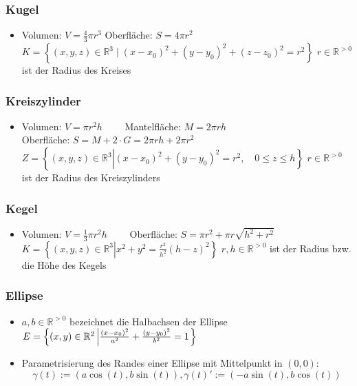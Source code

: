 \documentclass[a3paper, 11pt, landscape]{scrartcl}
\begin{document}
\begin{multicols*}{3}
	\subsubsection{Kugel}
	\begin{itemize}
	    \item Volumen: $V=\frac{4}{3}\pi r^3$ \hspace{15pt} Oberfläche: $S=4\pi r^2$
		$K=\left\{(x, y, z)\in \mathbb{R}^3 \mid (x-x_0)^2+(y-y_0)^2+(z-z_0)^2 = r^2 \right\}$
		$r \in \mathbb{R}^{>0}$ ist der Radius des Kreises
	\end{itemize}
		
	\subsubsection{Kreiszylinder}
	\begin{itemize}
	    \item Volumen: $V=\pi r^2 h\quad\quad$  Mantelfläche: $M=2\pi r h$\\
		Oberfläche: $S=M+2\cdot G=2\pi r h+2\pi r^2$\\
		$Z=\left\{(x, y, z)\in \mathbb{R}^3 \left \vert  (x-x_0)^2+(y-y_0)^2 =r^2, \quad 0\le z \le h \right. \right\}$
		$r \in \mathbb{R}^{>0}$ ist der Radius des Kreiszylinders
	\end{itemize}
		
	\subsubsection{Kegel}
	\begin{itemize}
	    \item Volumen: $V=\frac{1}{3}\pi r^2h\quad\quad$ Oberfläche: $S=\pi r^2+\pi r\sqrt{h^2+r^2}$\\
		$K=\left\{(x, y, z)\in \mathbb{R}^3 \left \vert  x^2+y^2 = \frac{r^2}{h^2}(h-z)^2 \right. \right\}$
		$r, h \in \mathbb{R}^{>0}$ ist der Radius bzw. die Höhe des Kegels
	\end{itemize}
		
	\subsubsection{Ellipse}
	\begin{itemize}
	    \item $a, b \in \mathbb{R}^{>0}$ bezeichnet die Halbachsen der Ellipse
		$E=\left\{(x, y)\in \mathbb{R}^2 \large \left \vert \frac{(x-x_0)^2}{a^2}+\frac{(y-y_0)^2 }{b^2}= 1 \right. \right\}$
		\item Parametrisierung des Randes einer Ellipse mit Mittelpunkt in $(0,0)$:\\
		$$\gamma(t):=(a \cos (t), b \sin (t)), \gamma(t)':=(-a \sin (t), b \cos (t))$$
	\end{itemize}
		

\end{multicols*}
\end{document}
